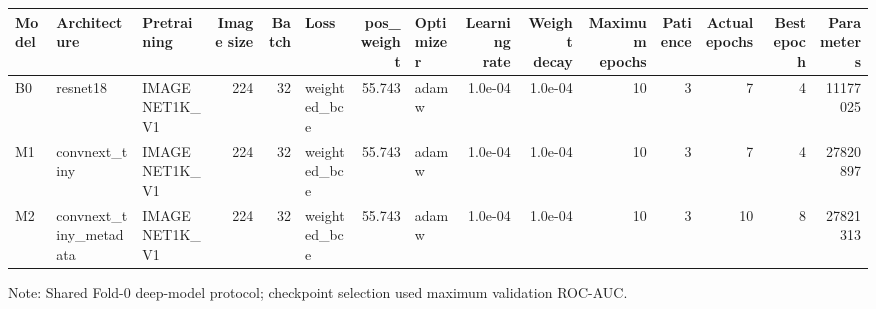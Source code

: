 \begin{table}[t]
\centering
\small
\begin{tabular}{lllrrlrlrrrrrrr}
\toprule
Model & Architecture & Pretraining & Image size & Batch & Loss & pos\_weight & Optimizer & Learning rate & Weight decay & Maximum epochs & Patience & Actual epochs & Best epoch & Parameters \\
\midrule
B0 & resnet18 & IMAGENET1K\_V1 & 224 & 32 & weighted\_bce & 55.743 & adamw & 1.0e-04 & 1.0e-04 & 10 & 3 & 7 & 4 & 11177025 \\
M1 & convnext\_tiny & IMAGENET1K\_V1 & 224 & 32 & weighted\_bce & 55.743 & adamw & 1.0e-04 & 1.0e-04 & 10 & 3 & 7 & 4 & 27820897 \\
M2 & convnext\_tiny\_metadata & IMAGENET1K\_V1 & 224 & 32 & weighted\_bce & 55.743 & adamw & 1.0e-04 & 1.0e-04 & 10 & 3 & 10 & 8 & 27821313 \\
\bottomrule
\end{tabular}
\vspace{2pt}
\parbox{0.98\textwidth}{\footnotesize Note: Shared Fold-0 deep-model protocol; checkpoint selection used maximum validation ROC-AUC.}
\end{table}

